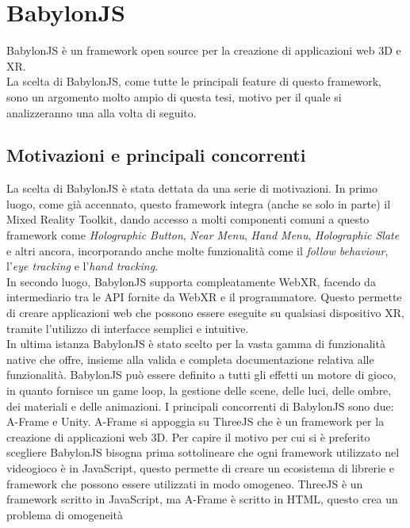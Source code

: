 \section{BabylonJS}\label{sec:BabylonJS}
BabylonJS è un framework open source per la creazione di applicazioni web 3D e XR\cite{BabylonJS}.\\
La scelta di BabylonJS, come tutte le principali feature di questo framework, sono un argomento molto ampio di questa tesi, motivo per il quale si analizzeranno una alla volta di seguito.

\subsection{Motivazioni e principali concorrenti}\label{subsec:BabylonJS_motivazioni}
La scelta di BabylonJS è stata dettata da una serie di motivazioni. In primo luogo, come già accennato, questo framework integra (anche se solo in parte) il Mixed Reality
Toolkit, dando accesso a molti componenti comuni a questo framework come \textit{Holographic Button}, \textit{Near Menu}, \textit{Hand Menu}, \textit{Holographic Slate} e altri 
ancora, incorporando anche molte funzionalità come il \textit{follow behaviour}, l'\textit{eye tracking} e l'\textit{hand tracking}.\\
In secondo luogo, BabylonJS supporta compleatamente WebXR, facendo da intermediario tra le API fornite da WebXR e il programmatore. Questo permette di creare applicazioni web
che possono essere eseguite su qualsiasi dispositivo XR, tramite l'utilizzo di interfacce semplici e intuitive.\\
In ultima istanza BabylonJS è stato scelto per la vasta gamma di funzionalità native che offre, insieme alla valida e completa documentazione relativa alle funzionalità. BabylonJS
può essere definito a tutti gli effetti un motore di gioco, in quanto fornisce un game loop, la gestione delle scene, delle luci, delle ombre, dei materiali e 
delle animazioni.
\newline \newline
I principali concorrenti di BabylonJS sono due: A-Frame e Unity. A-Frame si appoggia su ThreeJS che è un framework per la creazione di applicazioni web 3D. Per capire il motivo per
cui si è preferito scegliere BabylonJS bisogna prima sottolineare che ogni framework utilizzato nel videogioco è in JavaScript, questo permette di creare un ecosistema di librerie
e framework che possono essere utilizzati in modo omogeneo. ThreeJS è un framework scritto in JavaScript, ma A-Frame è scritto in HTML, questo crea un problema di omogeneità
